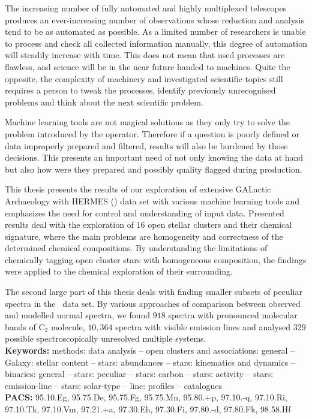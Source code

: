 The increasing number of fully automated and highly multiplexed telescopes produces an ever-increasing number of observations whose reduction and analysis tend to be as automated as possible. As a limited number of researchers is unable to process and check all collected information manually, this degree of automation will steadily increase with time. This does not mean that used processes are flawless, and science will be in the near future handed to machines. Quite the opposite, the complexity of machinery and investigated scientific topics still requires a person to tweak the processes, identify previously unrecognised problems and think about the next scientific problem.

Machine learning tools are not magical solutions as they only try to solve the problem introduced by the operator. Therefore if a question is poorly defined or data improperly prepared and filtered, results will also be burdened by those decisions. This presents an important need of not only knowing the data at hand but also how were they prepared and possibly quality flagged during production.

This thesis presents the results of our exploration of extensive GALactic Archaeology with HERMES (\Gh) data set with various machine learning tools and emphasizes the need for control and understanding of input data. Presented results deal with the exploration of 16 open stellar clusters and their chemical signature, where the main problems are homogeneity and correctness of the determined chemical compositions. By understanding the limitations of chemically tagging open cluster stars with homogeneous composition, the findings were applied to the chemical exploration of their surrounding. 

The second large part of this thesis deals with finding smaller subsets of peculiar spectra in the \Gh\ data set. By various approaches of comparison between observed and modelled normal spectra, we found $918$ spectra with pronounced molecular bands of C$_2$ molecule, $10,364$ spectra with visible emission lines and analysed $329$ possible spectroscopically unresolved multiple systems.\\[10mm]
{\bf Keywords:} methods: data analysis -- open clusters and associations: general -- Galaxy: stellar content -- stars: abundances -- stars: kinematics and dynamics -- binaries: general -- stars: peculiar -- stars: carbon -- stars: activity -- stars: emission-line -- stars: solar-type -- line: profiles -- catalogues\\[3mm]
{\bf PACS:} 95.10.Eg, 95.75.De, 95.75.Fg, 95.75.Mn, 95.80.+p, 97.10.-q, 97.10.Ri, 97.10.Tk, 97.10.Vm, 97.21.+a, 97.30.Eh, 97.30.Fi, 97.80.-d, 97.80.Fk, 98.58.Hf